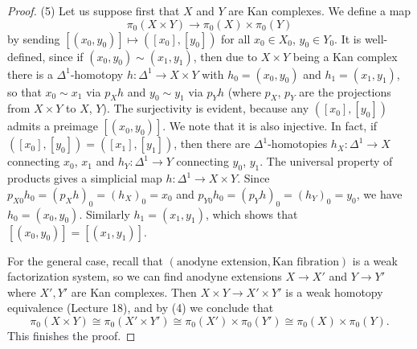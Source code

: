 \documentclass[a4paper,11pt,openany]{scrartcl}
\begin{document}
\begin{proof}
(5) Let us suppose first that $X$ and $Y$ are Kan complexes. We define a map 
\[
\pi_0(X\times Y)\to\pi_0(X)\times\pi_0(Y)
\]
by sending $[(x_0,y_0)]\mapsto([x_0],[y_0])$ for all $x_0\in X_0$, $y_0\in Y_0$. It is well-defined, since if $(x_0,y_0)\sim(x_1,y_1)$, then due to $X\times Y$ being a Kan complex there is a $\Delta^1$-homotopy $h\colon\Delta^1\to X\times Y$ with $h_0=(x_0,y_0)$ and $h_1=(x_1,y_1)$, so that $x_0\sim x_1$ via $p_Xh$ and $y_0\sim y_1$ via $p_Yh$ (where $p_X$, $p_Y$ are the projections from $X\times Y$ to $X$, $Y$). The surjectivity is evident, because any $([x_0],[y_0])$ admits a preimage $[(x_0,y_0)]$. We note that it is also injective. In fact, if $([x_0],[y_0])=([x_1],[y_1])$, then there are $\Delta^1$-homotopies $h_X\colon\Delta^1\to X$ connecting $x_0$, $x_1$ and $h_Y\colon\Delta^1\to Y$ connecting $y_0$, $y_1$. The universal property of products gives a simplicial map $h\colon\Delta^1\to X\times Y$. Since $p_{X0}h_0=(p_Xh)_0=(h_X)_0=x_0$ and $p_{Y0}h_0=(p_Yh)_0=(h_Y)_0=y_0$, we have $h_0=(x_0,y_0)$. Similarly $h_1=(x_1,y_1)$, which shows that $[(x_0,y_0)]=[(x_1,y_1)]$.

For the general case, recall that $(\text{anodyne extension},\text{Kan fibration})$ is a weak factorization system, so we can find anodyne extensions $X\to X'$ and $Y\to Y'$ where $X',Y'$ are Kan complexes. Then $X\times Y\to X'\times Y'$ is a weak homotopy equivalence (Lecture 18), and by (4) we conclude that
\[
\pi_0(X\times Y)\cong\pi_0(X'\times Y')\cong\pi_0(X')\times\pi_0(Y')\cong\pi_0(X)\times\pi_0(Y).
\]
This finishes the proof.
\end{proof}
\end{document}
